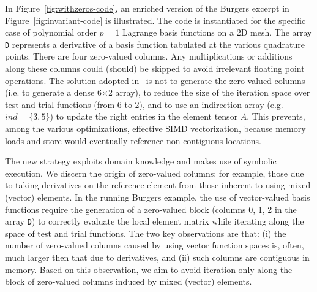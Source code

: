 In Figure~\ref{fig:withzeros-code}, an enriched version of the Burgers excerpt in Figure~\ref{fig:invariant-code} is illustrated. The code is instantiated for the specific case of polynomial order $p=1$ Lagrange basis functions on a 2D mesh. The array \texttt{D} represents a derivative of a basis function tabulated at the various quadrature points. There are four zero-valued columns. Any multiplications or additions along these columns could (should) be skipped to avoid irrelevant floating point operations. The solution adopted in~\cite{quadrature-olegaard} is not to generate the zero-valued columns (i.e. to generate a dense 6$\times$2 array), to reduce the size of the iteration space over test and trial functions (from 6 to 2), and to use an indirection array (e.g. $ind = \lbrace 3, 5\rbrace$) to update the right entries in the element tensor $A$. This prevents, among the various optimizations, effective SIMD vectorization, because memory loads and store would eventually reference non-contiguous locations. 

The new strategy exploits domain knowledge and makes use of symbolic execution. We discern the origin of zero-valued columns: for example, those due to taking derivatives on the reference element from those inherent to using mixed (vector) elements. In the running Burgers example, the use of vector-valued basis functions require the generation of a zero-valued block (columns 0, 1, 2 in the array \texttt{D}) to correctly evaluate the local element matrix while iterating along the space of test and trial functions. The two key observations are that: (i) the number of zero-valued columns caused by using vector function spaces is, often, much larger then that due to derivatives, and (ii) such columns are contiguous in memory. Based on this observation, we aim to avoid iteration only along the block of zero-valued columns induced by mixed (vector) elements. 


